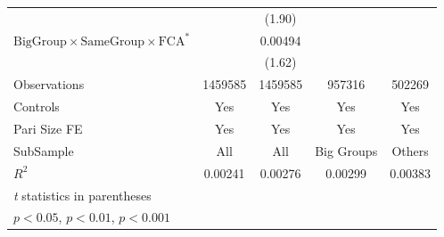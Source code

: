 {\begin{tabular}{l*{4}{c}}
                &                  &   (1.90)         &                  &                  \\
[1em]
$ {\text{BigGroup} } \times {\text{SameGroup} } \times \text{FCA}^* $ &                  &  0.00494         &                  &                  \\
                &                  &   (1.62)         &                  &                  \\
\hline
Observations    &  1459585         &  1459585         &   957316         &   502269         \\
Controls        &      Yes         &      Yes         &      Yes         &      Yes         \\
Pari Size FE    &      Yes         &      Yes         &      Yes         &      Yes         \\
SubSample       &      All         &      All         &Big Groups         &   Others         \\
$ R^2$          &  0.00241         &  0.00276         &  0.00299         &  0.00383         \\
\hline\hline
\multicolumn{5}{l}{\footnotesize \textit{t} statistics in parentheses}\\
\multicolumn{5}{l}{\footnotesize \sym{*} \(p<0.05\), \sym{**} \(p<0.01\), \sym{***} \(p<0.001\)}\\
\end{tabular}
}

